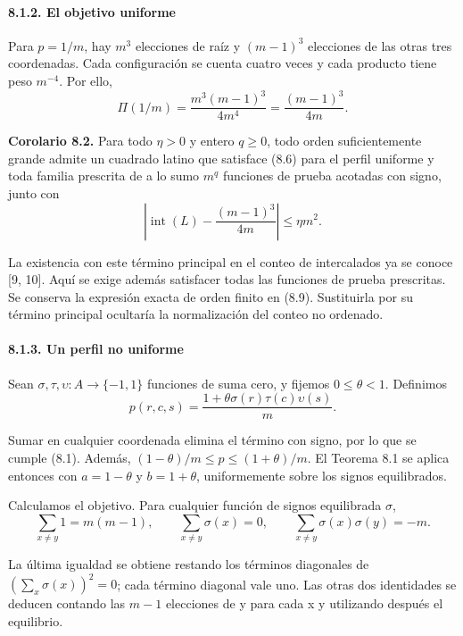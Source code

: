 \documentclass[spanish,11pt,a4paper]{article}
\begin{document}
\paragraph{8.1.2. El objetivo uniforme}\label{el-objetivo-uniforme}

Para \(p=1/m\), hay \(m^3\) elecciones de raíz y \((m-1)^3\) elecciones de las otras tres coordenadas. Cada configuración se cuenta cuatro veces y cada producto tiene peso \(m^{-4}\). Por ello,
\[\Pi(1/m)=\frac{m^3(m-1)^3}{4m^4}
=\frac{(m-1)^3}{4m}.                                               \tag{8.9}\]

\textbf{Corolario 8.2.} Para todo \(\eta>0\) y entero \(q\geq0\), todo orden suficientemente grande admite un cuadrado latino que satisface (8.6) para el perfil uniforme y toda familia prescrita de a lo sumo \(m^q\) funciones de prueba acotadas con signo, junto con
\[\left|\operatorname{int}(L)-\frac{(m-1)^3}{4m}\right|
\leq\eta m^2.                                                       \tag{8.10}\]

La existencia con este término principal en el conteo de intercalados ya se conoce {[}9, 10{]}. Aquí se exige además satisfacer todas las funciones de prueba prescritas. Se conserva la expresión exacta de orden finito en (8.9). Sustituirla por su término principal ocultaría la normalización del conteo no ordenado.

\paragraph{8.1.3. Un perfil no uniforme}\label{un-perfil-no-uniforme}

Sean \(\sigma,\tau,\upsilon:A\to\{-1,1\}\) funciones de suma cero, y fijemos \(0\leq\theta<1\). Definimos
\[p(r,c,s)=\frac{1+\theta\sigma(r)\tau(c)\upsilon(s)}m.               \tag{8.11}\]

Sumar en cualquier coordenada elimina el término con signo, por lo que se cumple (8.1). Además, \((1-\theta)/m\leq p\leq(1+\theta)/m\). El Teorema 8.1 se aplica entonces con \(a=1-\theta\) y \(b=1+\theta\), uniformemente sobre los signos equilibrados.

Calculamos el objetivo. Para cualquier función de signos equilibrada \(\sigma\),
\[\sum_{x\ne y}1=m(m-1),\qquad
\sum_{x\ne y}\sigma(x)=0,\qquad
\sum_{x\ne y}\sigma(x)\sigma(y)=-m.                                \tag{8.12}\]

La última igualdad se obtiene restando los términos diagonales de \((\sum_x\sigma(x))^2=0\); cada término diagonal vale uno. Las otras dos identidades se deducen contando las \(m-1\) elecciones de y para cada x y utilizando después el equilibrio.
\end{document}
